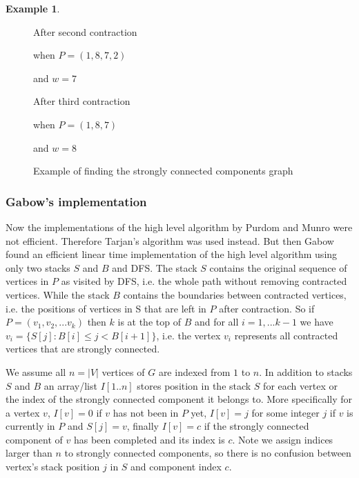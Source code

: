\documentclass{report}
\theoremstyle{plain}
\theoremstyle{definition}
\newtheorem{example}{Example}
\theoremstyle{remark}
\numberwithin{definition}{chapter}
\numberwithin{example}{chapter}
\numberwithin{figure}{chapter}
\numberwithin{theorem}{chapter}
\numberwithin{lemma}{chapter}
\begin{document}
\begin{example}
\begin{figure}[h]
After second contraction

when $P=(1,8,7,2)$

and $w=7$
\endminipage\hfill
{}

After third contraction

when $P=(1,8,7)$

and $w=8$
\endminipage\hfill

\caption{Example of finding the strongly connected components graph}
\label{high_figure}
\end{figure}
\label{high_example}
\end{example}

\subsubsection*{Gabow's implementation}

Now the implementations of the high level algorithm by Purdom and Munro were not efficient. Therefore Tarjan's algorithm was used instead. But then Gabow found an efficient linear time implementation of the high level algorithm using only two stacks $S$ and $B$ and DFS. The stack $S$ contains the original sequence of vertices in $P$ as visited by DFS, i.e. the whole path without removing contracted vertices. While the stack $B$ contains the boundaries between contracted vertices, i.e. the positions of vertices in S that are left in $P$ after contraction. So if $P=(v_1, v_2,...v_k)$ then $k$ is at the top of $B$ and for all $i = 1,...k-1$ we have $v_i=\{ S[j] : B[i] \leq j < B[i+1] \}$, i.e. the vertex $v_i$ represents all contracted vertices that are strongly connected.

We assume all $n=|V|$ vertices of $G$ are indexed from $1$ to $n$. In addition to stacks $S$ and $B$ an array/list $I[1..n]$ stores position in the stack $S$ for each vertex or the index of the strongly connected component it belongs to.  More specifically for a vertex $v$, $I[v] = 0$ if $v$ has not been in $P$ yet, $I[v]=j$ for some integer $j$ if $v$ is currently in $P$ and $S[j]=v$, finally $I[v]=c$ if the strongly connected component of $v$ has been completed and its index is $c$. Note we assign indices larger than $n$ to strongly connected components, so there is no confusion between vertex's stack position $j$ in $S$ and component index $c$.
\end{document}
